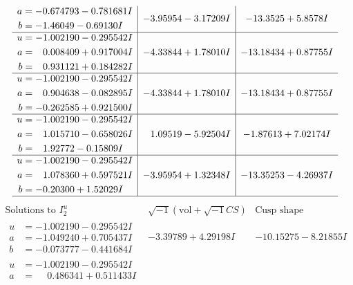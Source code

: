 \documentclass[1p]{elsarticle_modified}
\theoremstyle{definition}
\newcommand{\I}{\sqrt{-1}}
\begin{document}
$$\begin{array}{c|c|c}
\begin{aligned}
a &= -0.674793 - 0.781681 I \\
b &= -1.46049 - 0.69130 I\end{aligned}
 & -3.95954 - 3.17209 I & -13.3525 + 5.8578 I \\ \hline\begin{aligned}
u &= -1.002190 - 0.295542 I \\
a &= \phantom{-}0.008409 + 0.917004 I \\
b &= \phantom{-}0.931121 + 0.184282 I\end{aligned}
 & -4.33844 + 1.78010 I & -13.18434 + 0.87755 I \\ \hline\begin{aligned}
u &= -1.002190 - 0.295542 I \\
a &= \phantom{-}0.904638 - 0.082895 I \\
b &= -0.262585 + 0.921500 I\end{aligned}
 & -4.33844 + 1.78010 I & -13.18434 + 0.87755 I \\ \hline\begin{aligned}
u &= -1.002190 - 0.295542 I \\
a &= \phantom{-}1.015710 - 0.658026 I \\
b &= \phantom{-}1.92772 - 0.15809 I\end{aligned}
 & \phantom{-}1.09519 - 5.92504 I & -1.87613 + 7.02174 I \\ \hline\begin{aligned}
u &= -1.002190 - 0.295542 I \\
a &= \phantom{-}1.078360 + 0.597521 I \\
b &= -0.20300 + 1.52029 I\end{aligned}
 & -3.95954 + 1.32348 I & -13.35253 - 4.26937 I\\
 \hline 
 \end{array}$$\newpage$$\begin{array}{c|c|c}  
\text{Solutions to }I^u_{2}& \I (\text{vol} + \sqrt{-1}CS) & \text{Cusp shape}\\
 \hline 
\begin{aligned}
u &= -1.002190 - 0.295542 I \\
a &= -1.049240 + 0.705437 I \\
b &= -0.073777 - 0.441684 I\end{aligned}
 & -3.39789 + 4.29198 I & -10.15275 - 8.21855 I \\ \hline\begin{aligned}
u &= -1.002190 - 0.295542 I \\
a &= \phantom{-}0.486341 + 0.511433 I \\

\end{aligned}
\end{array}$$
\end{document}
